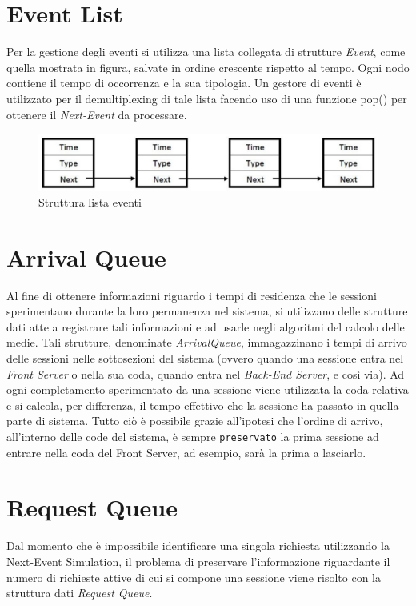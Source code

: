 \section{Event List}
Per la gestione degli eventi si utilizza una lista collegata di strutture \textit{Event}, come quella mostrata in figura, salvate in ordine crescente rispetto al tempo. Ogni nodo contiene il tempo di occorrenza e la sua tipologia. Un gestore di eventi è utilizzato per il demultiplexing di tale lista facendo uso di una funzione pop() per ottenere il \textit{Next-Event} da processare.
\begin{figure}[H]
  \centering
  \includegraphics[scale=0.5]{img/EventList.png}
  \caption[EventList]{Struttura lista eventi}
  \label{fig:eventList}
\end{figure}

\section{Arrival Queue}
Al fine di ottenere informazioni riguardo i tempi di residenza che le sessioni sperimentano durante la loro permanenza nel sistema, si utilizzano delle strutture dati atte a registrare tali informazioni e ad usarle negli algoritmi del calcolo delle medie. Tali strutture, denominate \textit{ArrivalQueue}, immagazzinano i tempi di arrivo delle sessioni nelle sottosezioni del sistema (ovvero quando una sessione entra nel \textit{Front Server} o nella sua coda, quando entra nel \textit{Back-End Server}, e così via). Ad ogni completamento sperimentato da una sessione viene utilizzata la coda relativa e si calcola, per differenza, il tempo effettivo che la sessione ha passato in quella parte di sistema. Tutto ciò è possibile grazie all'ipotesi che l'ordine di arrivo, all'interno delle code del sistema, è sempre \texttt{preservato} la prima sessione ad entrare nella coda del Front Server, ad esempio, sarà la prima a lasciarlo.

\section{Request Queue}
Dal momento che è impossibile identificare una singola richiesta utilizzando la Next-Event Simulation, il problema di preservare l'informazione riguardante il numero di richieste attive di cui si compone una sessione viene risolto con la struttura dati \textit{Request Queue}. 

